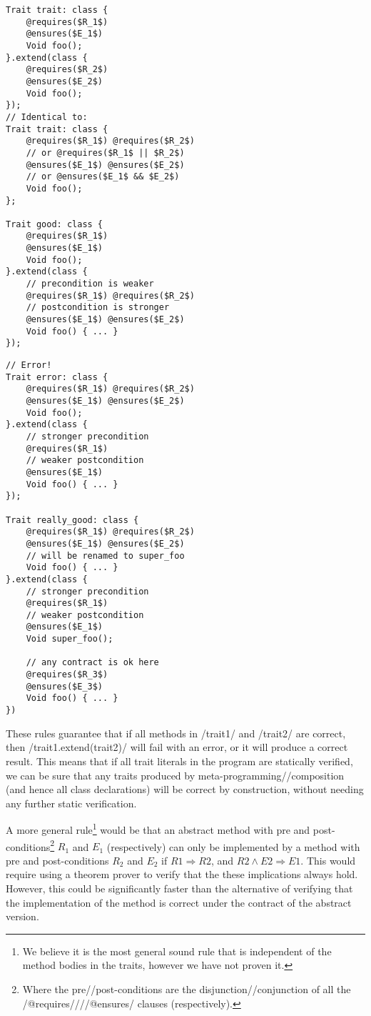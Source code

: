 \vspace{-3\medskipamount}%
\noindent\begin{minipage}[t]{0pt}
\begin{lstlisting}
Trait trait: class {
	@requires($R_1$)
	@ensures($E_1$)
	Void foo();
}.extend(class {
	@requires($R_2$)
	@ensures($E_2$)
	Void foo();
});
// Identical to:
Trait trait: class {
	@requires($R_1$) @requires($R_2$)
	// or @requires($R_1$ || $R_2$)
	@ensures($E_1$) @ensures($E_2$)
	// or @ensures($E_1$ && $E_2$)
	Void foo();
};

Trait good: class {
	@requires($R_1$)
	@ensures($E_1$)
	Void foo();
}.extend(class {
	// precondition is weaker
	@requires($R_1$) @requires($R_2$)
	// postcondition is stronger
	@ensures($E_1$) @ensures($E_2$)
	Void foo() { ... }
});
\end{lstlisting}
\end{minipage}\hfill
\newlength{\listingWidth}
\begin{minipage}[t]{33\listingWidth}
\begin{lstlisting}
// Error!
Trait error: class {
	@requires($R_1$) @requires($R_2$)
	@ensures($E_1$) @ensures($E_2$)
	Void foo();
}.extend(class {
	// stronger precondition
	@requires($R_1$)
	// weaker postcondition 
	@ensures($E_1$)
	Void foo() { ... }
});

Trait really_good: class {
	@requires($R_1$) @requires($R_2$)
	@ensures($E_1$) @ensures($E_2$)
	// will be renamed to super_foo
	Void foo() { ... }
}.extend(class {
	// stronger precondition
	@requires($R_1$)
	// weaker postcondition
	@ensures($E_1$)
	Void super_foo();

	// any contract is ok here
	@requires($R_3$)
	@ensures($E_3$)
	Void foo() { ... }
})
\end{lstlisting}%
\end{minipage}

\noindent These rules guarantee that if all methods in /trait1/ and /trait2/ are correct, then /trait1.extend(trait2)/ will fail with an error, or it will produce a correct result. This means that if all trait literals in the program are statically verified, we can be sure that any traits produced by meta-programming//composition (and hence all class declarations) will be correct by construction, without needing any further static verification.

A more general rule\footnote{We believe it is the most general sound rule that is independent of the method bodies in the traits, however we have not proven it.} would be that an abstract method with pre and post-conditions\footnote{Where the pre//post-conditions are the disjunction//conjunction of all the /@requires////@ensures/ clauses (respectively).} $R_1$ and $E_1$ (respectively) can only be implemented by a method with pre and post-conditions $R_2$ and $E_2$ if $R1 \Rightarrow R2$, and $R2 \wedge E2 \Rightarrow E1$. This would require using a theorem prover to verify that the these implications always hold. However, this could be significantly faster than the alternative of verifying that the implementation of the method is correct under the contract of the abstract version.